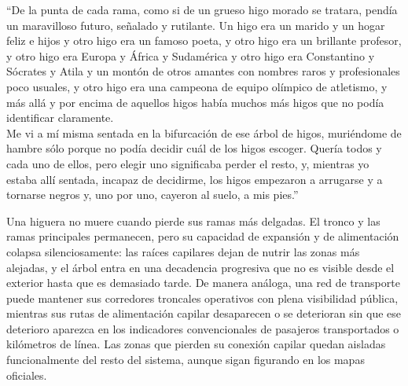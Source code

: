 {\begin{center}
``De la punta de cada rama, como si de un grueso higo morado se tratara, pendía
un
maravilloso futuro, señalado y rutilante. Un higo era un marido y un hogar feliz
e
hijos y otro higo era un famoso poeta, y otro higo era un brillante profesor, y
otro
higo era Europa y África y Sudamérica y otro higo era Constantino y Sócrates y
Atila
y un montón de otros amantes con nombres raros y profesionales poco usuales, y
otro
higo era una campeona de equipo olímpico de atletismo, y más allá y por encima
de
    aquellos higos había muchos más higos que no podía identificar claramente.
    \\ \vspace{1ex}
Me vi a mí misma sentada en la bifurcación de ese árbol de higos, muriéndome de
hambre sólo porque no podía decidir cuál de los higos escoger. Quería todos y
cada
uno de ellos, pero elegir uno significaba perder el resto, y, mientras yo estaba
allí
sentada, incapaz de decidirme, los higos empezaron a arrugarse y a tornarse
negros y,
    uno por uno, cayeron al suelo, a mis pies.'' \\
    \vspace{1ex}
    \citep{plath2019campana}
  \end{center}
}


Una higuera no muere cuando pierde sus ramas más delgadas. El tronco y las ramas
principales permanecen, pero su capacidad de expansión y de alimentación colapsa
silenciosamente: las raíces capilares dejan de nutrir las zonas más alejadas, y
el árbol entra en una decadencia progresiva que no es visible desde el exterior
hasta que es demasiado tarde. De manera análoga, una red de transporte puede
mantener sus corredores troncales operativos con plena visibilidad pública,
mientras sus rutas de alimentación capilar desaparecen o se deterioran sin que
ese deterioro aparezca en los indicadores convencionales de pasajeros
transportados o kilómetros de línea. Las zonas que pierden su conexión capilar
quedan aisladas funcionalmente del resto del sistema, aunque sigan figurando en
los mapas oficiales.

